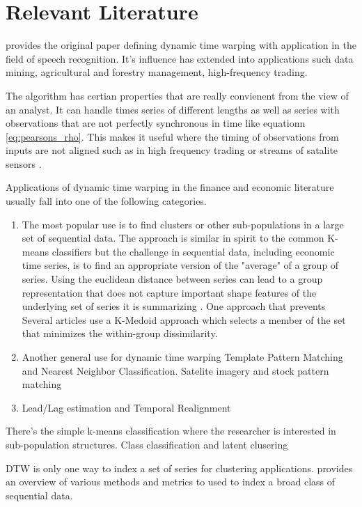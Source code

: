 \documentclass[12pt]{article}
\begin{document}
\section{Relevant Literature}

\cite{SakoeChiba_IEEE_1978} provides the original paper defining dynamic time warping with application in the field of speech recognition. It's influence has extended into applications such data mining, agricultural and forestry management, high-frequency trading.

The algorithm has certian properties that are really convienent from the view of an analyst. It can handle times series of different lengths as well as series with observations that are not perfectly synchronous in time like equationn \ref{eq:pearsons_rho}.  This makes it useful where the timing of observations from inputs are not aligned such as in high frequency trading or streams of satalite sensors \parencite{Maus_et_al_2016}.

Applications of dynamic time warping in the finance and economic literature usually fall into one of the following categories.

\begin{enumerate}
    \item The most popular use is to find clusters or other sub-populations in a large set of sequential data. The approach is similar in spirit to the common K-means classifiers but the challenge in sequential data, including economic time series, is to find an appropriate version of the "average" of a group of series. Using the euclidean distance between series can lead to a group representation that does not capture important shape features of the underlying set of series it is summarizing \parencite{PETITJEAN2011678}. One approach that prevents Several articles use a K-Medoid approach which selects a member of the set that minimizes the within-group dissimilarity.
    \item Another general use for dynamic time warping Template Pattern Matching and Nearest Neighbor Classiﬁcation. Satelite imagery and stock pattern matching
    \item Lead/Lag estimation and Temporal Realignment
\end{enumerate}
There's the simple k-means classification where the researcher is interested in sub-population structures.  Class classification and latent clusering 

DTW is only one way to index a set of series for clustering applications. \cite{ElsingAgon2012} provides an overview of various methods and metrics to used to index a broad class of sequential data.
\end{document}

